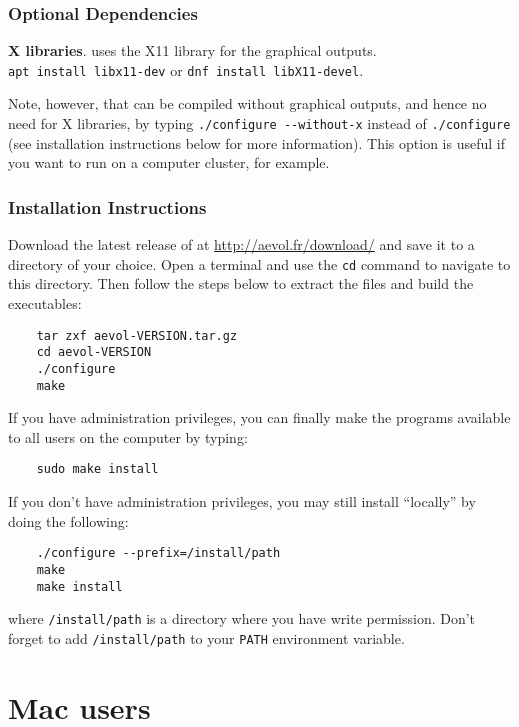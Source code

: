 \subsubsection{Optional Dependencies}
\begin{myList} 
\item \textbf{X libraries}.  \aevol{} uses the X11 library for the
  graphical outputs.\\
  \verb?apt install libx11-dev? or \verb?dnf install libX11-devel?.

Note, however, that \aevol{} can be compiled without graphical
outputs, and hence no need for X libraries, by typing
\verb?./configure --without-x?  instead of \verb?./configure? (see
installation instructions below for more information). This option is
useful if you want to run \aevol{} on a computer cluster, for example.
\end{myList}

\subsubsection{Installation Instructions}
Download the latest release of \aevol{} at
\url{http://aevol.fr/download/} and save it to a directory of your
choice.  Open a terminal and use the \verb+cd+ command to navigate to
this directory.  Then follow the steps below to extract the files and
build the executables:

\begin{verbatim}
	tar zxf aevol-VERSION.tar.gz
	cd aevol-VERSION
	./configure
	make
\end{verbatim}

If you have administration privileges, you can finally make the
\aevol{} programs available to all users on the computer by typing:
\begin{verbatim}
	sudo make install
\end{verbatim}

If you don't have administration privileges, you may still install
\aevol{} ``locally'' by doing the following:
\begin{verbatim}
	./configure --prefix=/install/path
	make
	make install
\end{verbatim}
where \verb?/install/path? is a directory where you have write
permission. Don't forget to add \verb?/install/path? to your
\verb?PATH? environment variable.



\section{Mac users}
\label{sec:mac}

